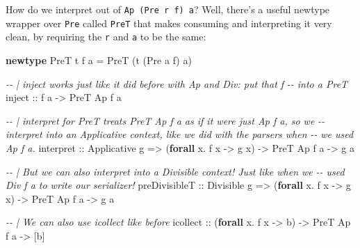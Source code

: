 \documentclass[]{article}
\newenvironment{Shaded}{}{}
\newcommand{\CommentTok}[1]{\textcolor[rgb]{0.38,0.63,0.69}{\textit{#1}}}
\newcommand{\DataTypeTok}[1]{\textcolor[rgb]{0.56,0.13,0.00}{#1}}
\newcommand{\KeywordTok}[1]{\textcolor[rgb]{0.00,0.44,0.13}{\textbf{#1}}}
\newcommand{\NormalTok}[1]{#1}
\newcommand{\OperatorTok}[1]{\textcolor[rgb]{0.40,0.40,0.40}{#1}}
\newcommand{\OtherTok}[1]{\textcolor[rgb]{0.00,0.44,0.13}{#1}}
\begin{document}
How do we interpret out of \texttt{Ap\ (Pre\ r\ f)\ a}? Well, there's a useful
newtype wrapper over \texttt{Pre} called \texttt{PreT} that makes consuming and
interpreting it very clean, by requiring the \texttt{r} and \texttt{a} to be the
same:

\begin{Shaded}
\begin{Highlighting}[]
\KeywordTok{newtype} \DataTypeTok{PreT}\NormalTok{ t f a }\OtherTok{=} \DataTypeTok{PreT}\NormalTok{ (t (}\DataTypeTok{Pre}\NormalTok{ a f) a)}

\CommentTok{{-}{-} | \textasciigrave{}inject\textasciigrave{} works just like it did before with \textasciigrave{}Ap\textasciigrave{} and \textasciigrave{}Div\textasciigrave{}: put that \textasciigrave{}f\textasciigrave{}}
\CommentTok{{-}{-} into a \textasciigrave{}PreT\textasciigrave{}}
\OtherTok{inject ::}\NormalTok{ f a }\OtherTok{{-}>} \DataTypeTok{PreT} \DataTypeTok{Ap}\NormalTok{ f a}

\CommentTok{{-}{-} | interpret for PreT treats \textasciigrave{}PreT Ap f a\textasciigrave{} as if it were just \textasciigrave{}Ap f a\textasciigrave{}, so we}
\CommentTok{{-}{-} interpret into an \textasciigrave{}Applicative\textasciigrave{} context, like we did with the parsers when}
\CommentTok{{-}{-} we used \textasciigrave{}Ap f a\textasciigrave{}.}
\NormalTok{interpret}
\OtherTok{    ::} \DataTypeTok{Applicative}\NormalTok{ g}
    \OtherTok{=>}\NormalTok{ (}\KeywordTok{forall}\NormalTok{ x}\OperatorTok{.}\NormalTok{ f x }\OtherTok{{-}>}\NormalTok{ g x)}
    \OtherTok{{-}>} \DataTypeTok{PreT} \DataTypeTok{Ap}\NormalTok{ f a}
    \OtherTok{{-}>}\NormalTok{ g a}

\CommentTok{{-}{-} | But we can also interpret into a \textasciigrave{}Divisible\textasciigrave{} context!  Just like when we}
\CommentTok{{-}{-} used \textasciigrave{}Div f a\textasciigrave{} to write our serializer!}
\NormalTok{preDivisibleT}
\OtherTok{    ::} \DataTypeTok{Divisible}\NormalTok{ g}
    \OtherTok{=>}\NormalTok{ (}\KeywordTok{forall}\NormalTok{ x}\OperatorTok{.}\NormalTok{ f x }\OtherTok{{-}>}\NormalTok{ g x)}
    \OtherTok{{-}>} \DataTypeTok{PreT} \DataTypeTok{Ap}\NormalTok{ f a}
    \OtherTok{{-}>}\NormalTok{ g a}

\CommentTok{{-}{-} | We can also use icollect like before}
\NormalTok{icollect}
\OtherTok{    ::}\NormalTok{ (}\KeywordTok{forall}\NormalTok{ x}\OperatorTok{.}\NormalTok{ f x }\OtherTok{{-}>}\NormalTok{ b)}
    \OtherTok{{-}>} \DataTypeTok{PreT} \DataTypeTok{Ap}\NormalTok{ f a}
    \OtherTok{{-}>}\NormalTok{ [b]}
\end{Highlighting}
\end{Shaded}
\end{document}
